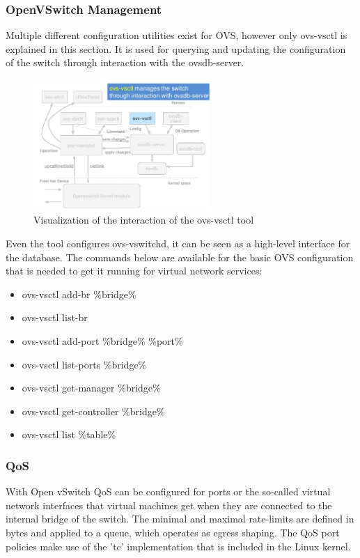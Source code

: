 \subsubsection{OpenVSwitch Management}

Multiple different configuration utilities exist for OVS, however only ovs-vsctl is explained in this section. It is used for querying and updating the configuration of the switch through interaction with the ovsdb-server.

\begin{figure}[H]
\centering
\includegraphics[width=0.6\textwidth]{images/fundamentals/openvswitch_vsctl.png}
\caption{Visualization of the interaction of the ovs-vsctl tool}
\end{figure}

Even the tool configures ovs-vswitchd, it can be seen as a high-level interface for the database.
The commands below are available for the basic OVS configuration that is needed to get it running for virtual network services:
\begin{itemize}
\item ovs-vsctl add-br \%bridge\%
\item ovs-vsctl list-br
\item ovs-vsctl add-port \%bridge\% \%port\%
\item ovs-vsctl list-ports \%bridge\%
\item ovs-vsctl get-manager \%bridge\%
\item ovs-vsctl get-controller \%bridge\%
\item ovs-vsctl list \%table\%
\end{itemize}


\subsubsection{QoS}

With Open vSwitch QoS can be configured for ports or the so-called virtual network interfaces that virtual machines get when they are connected to the internal bridge of the switch. The minimal and maximal rate-limits are defined in bytes and applied to a queue, which operates as egress shaping. The QoS port policies make use of the 'tc' implementation that is included in the Linux kernel.

